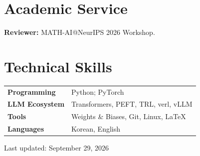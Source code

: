 \documentclass[a4paper,11pt]{article}
\begin{document}
\section{Academic Service}

\textbf{Reviewer:} MATH-AI@NeurIPS 2026 Workshop.

\section{Technical Skills}

\begin{tabularx}{\linewidth}{@{}>{\bfseries}p{3.3cm}L@{}}
  Programming & Python; PyTorch\\
  LLM Ecosystem & Transformers, PEFT, TRL, verl, vLLM\\
  Tools & Weights \& Biases, Git, Linux, \LaTeX\\
  Languages & Korean, English
\end{tabularx}

\vfill
\begin{center}
  \footnotesize Last updated: September 29, 2026
\end{center}
\end{document}

